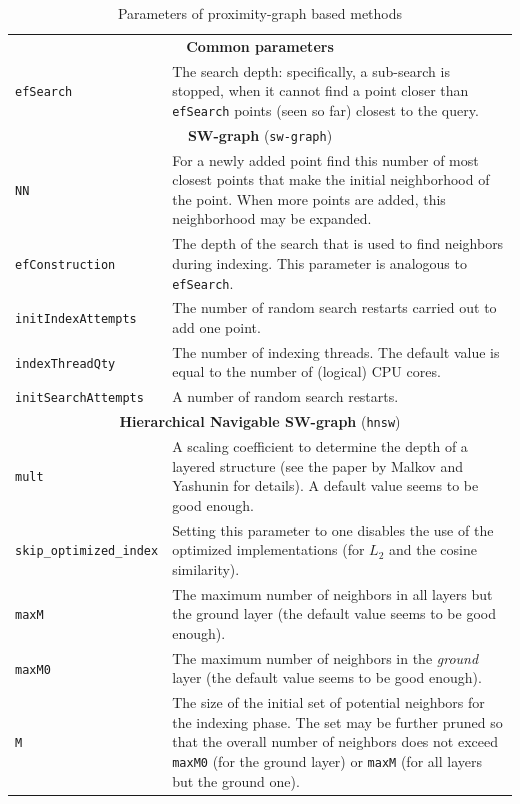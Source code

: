 \documentclass[runningheads,a4paper]{llncs}
\newcommand{\ttt}[1]{\texttt{#1}}
\begin{document}
\begin{table}
\caption{Parameters of proximity-graph based methods\label{TableProxGraphs}}
\centering
\begin{tabular}{l@{\hspace{2mm}}p{3.5in}}
\toprule
\multicolumn{2}{c}{\textbf{Common parameters}}\\
\cmidrule(l){1-2} 
\ttt{efSearch}            & The search depth: specifically, a sub-search is stopped,
                            when it cannot find a point closer than \ttt{efSearch}
                            points (seen so far) closest to the query.
\\
\cmidrule(l){1-2} 
\multicolumn{2}{c}{\textbf{SW-graph} (\ttt{sw-graph}) \cite{krylov2008metrized,malkov2012scalable,malkov2014}  }\\
\cmidrule(l){1-2} 
\ttt{NN}                  & For a newly added point find this number of most closest points
                            that make the initial neighborhood of the point. When more points are added,
                            this neighborhood may be expanded. \\
\ttt{efConstruction}      & The depth of the search that is used to find neighbors during indexing.
                            This parameter is analogous to \ttt{efSearch}.\\
\ttt{initIndexAttempts}   & The number of random search restarts carried out to add one point.\\
\ttt{indexThreadQty}      & The number of indexing threads. The default value is
                            equal to the number of (logical) CPU cores. \\
\ttt{initSearchAttempts}  & A number of random search restarts. \\
\cmidrule(l){1-2} 
\multicolumn{2}{c}{\textbf{Hierarchical Navigable SW-graph} (\ttt{hnsw}) \cite{malkov2014}  }\\
\cmidrule(l){1-2} 
\ttt{mult}                & A scaling coefficient to determine the depth of a layered structure (see the paper by Malkov and Yashunin \cite{malkov2014} for details). A default value seems to be good enough. \\
\ttt{skip\_optimized\_index}   & Setting this parameter to one disables the use of the optimized implementations (for $L_2$
                                 and the cosine similarity).
                          \\
\ttt{maxM}                & The maximum number of neighbors in all layers but the ground layer (the default value seems to be good enough). \\
\ttt{maxM0}               & The maximum number of neighbors in the \emph{ground} layer (the default value seems to be good enough). \\
\ttt{M}                   & The size of the initial set of potential neighbors for the indexing phase. The set may be further 
                            pruned so that the overall number of neighbors does not exceed \ttt{maxM0} (for the ground layer) or \ttt{maxM}
                            (for all layers but the ground one).\\
 

\end{tabular}
\end{table}
\end{document}
